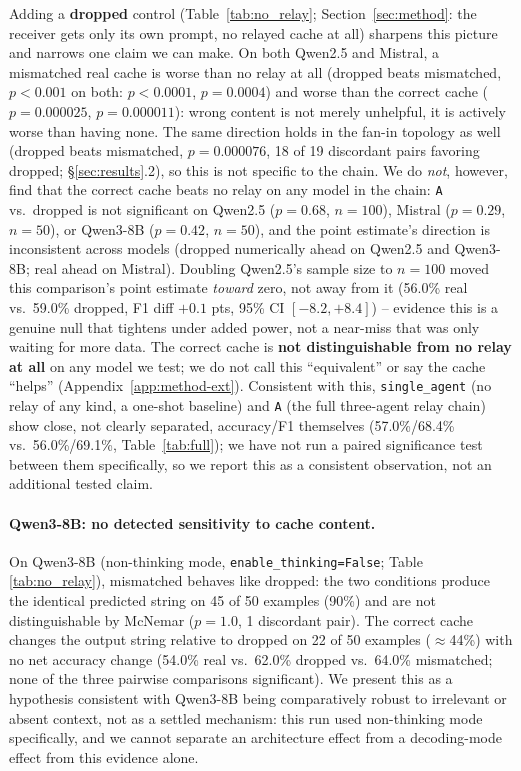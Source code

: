 \documentclass[11pt]{article}
\begin{document}
Adding a \textbf{dropped} control (Table~\ref{tab:no_relay};
Section~\ref{sec:method}: the receiver gets only its own prompt, no
relayed cache at all) sharpens this picture and narrows one claim we
can make. On both Qwen2.5 and Mistral, a mismatched real cache is worse
than no relay at all (dropped beats mismatched, $p<0.001$ on both:
$p<0.0001$, $p=0.0004$) and worse than the correct cache
($p=0.000025$, $p=0.000011$): wrong content is not merely unhelpful, it
is actively worse than having none. The same direction holds in the
fan-in topology as well (dropped beats mismatched, $p=0.000076$, 18 of
19 discordant pairs favoring dropped; \S\ref{sec:results}.2), so this
is not specific to the chain. We do \emph{not}, however, find
that the correct cache beats no relay on any model in the chain:
\texttt{A} vs.\ dropped is not significant on Qwen2.5 ($p=0.68$,
$n=100$), Mistral ($p=0.29$, $n=50$), or Qwen3-8B ($p=0.42$, $n=50$),
and the point estimate's direction is inconsistent across models
(dropped numerically ahead on Qwen2.5 and Qwen3-8B; real ahead on
Mistral). Doubling Qwen2.5's sample size to $n=100$ moved this
comparison's point estimate \emph{toward} zero, not away from it
(56.0\% real vs.\ 59.0\% dropped, F1 diff $+0.1$ pts, 95\% CI
$[-8.2,+8.4]$) -- evidence this is a genuine null that tightens under
added power, not a near-miss that was only waiting for more data. The
correct cache is \textbf{not distinguishable from no relay at all} on
any model we test; we do not call this ``equivalent'' or say the cache
``helps'' (Appendix~\ref{app:method-ext}). Consistent with this,
\texttt{single\_agent} (no relay of any kind, a one-shot baseline) and
\texttt{A} (the full three-agent relay chain) show close, not clearly
separated, accuracy/F1 themselves (57.0\%/68.4\% vs.\ 56.0\%/69.1\%,
Table~\ref{tab:full}); we have not run a paired significance test
between them specifically, so we report this as a consistent
observation, not an additional tested claim.

\paragraph{Qwen3-8B: no detected sensitivity to cache content.} On
Qwen3-8B (non-thinking mode, \texttt{enable\_thinking=False}; Table
\ref{tab:no_relay}), mismatched behaves like dropped: the two
conditions produce the identical predicted string on 45 of 50 examples
(90\%) and are not distinguishable by McNemar ($p=1.0$, 1 discordant
pair). The correct cache changes the output string relative to dropped
on 22 of 50 examples ($\approx$44\%) with no net accuracy change
(54.0\% real vs.\ 62.0\% dropped vs.\ 64.0\% mismatched; none of the
three pairwise comparisons significant). We present this as a
hypothesis consistent with Qwen3-8B being comparatively robust to
irrelevant or absent context, not as a settled mechanism: this run used
non-thinking mode specifically, and we cannot separate an architecture
effect from a decoding-mode effect from this evidence alone.
\end{document}
